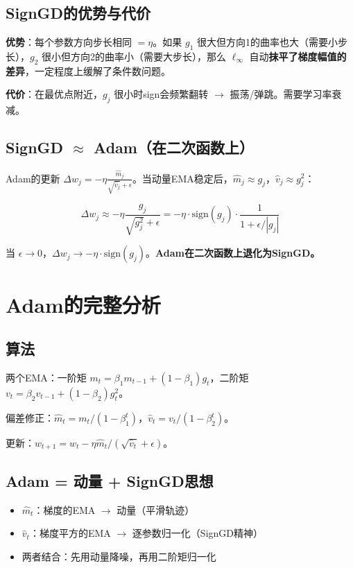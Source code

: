 \documentclass[12pt,a4paper]{article}
\begin{document}
\subsection{SignGD的优势与代价}

\textbf{优势}：每个参数方向步长相同 $= \eta$。如果 $g_1$ 很大但方向1的曲率也大（需要小步长），$g_2$ 很小但方向2的曲率小（需要大步长），那么 $\ell_\infty$ 自动\textbf{抹平了梯度幅值的差异}，一定程度上缓解了条件数问题。

\textbf{代价}：在最优点附近，$g_j$ 很小时sign会频繁翻转 $\to$ 振荡/弹跳。需要学习率衰减。


\subsection{SignGD $\approx$ Adam（在二次函数上）}

Adam的更新 $\Delta w_j = -\eta \frac{\hat{m}_j}{\sqrt{\hat{v}_j}+\epsilon}$。当动量EMA稳定后，$\hat{m}_j \approx g_j$，$\hat{v}_j \approx g_j^2$：


\[\Delta w_j \approx -\eta \frac{g_j}{\sqrt{g_j^2}+\epsilon} = -\eta \cdot \text{sign}(g_j) \cdot \frac{1}{1+\epsilon/|g_j|}\]

当 $\epsilon \to 0$，$\Delta w_j \to -\eta \cdot \text{sign}(g_j)$。\textbf{Adam在二次函数上退化为SignGD。}




\section{Adam的完整分析}


\subsection{算法}

两个EMA：一阶矩 $m_t = \beta_1 m_{t-1} + (1-\beta_1)g_t$，二阶矩 $v_t = \beta_2 v_{t-1} + (1-\beta_2)g_t^2$。

偏差修正：$\hat{m}_t = m_t/(1-\beta_1^t)$，$\hat{v}_t = v_t/(1-\beta_2^t)$。

更新：$w_{t+1} = w_t - \eta \hat{m}_t / (\sqrt{\hat{v}_t}+\epsilon)$。


\subsection{Adam = 动量 + SignGD思想}

\begin{itemize}[leftmargin=*,nosep]
\item $\hat{m}_t$：梯度的EMA $\to$ 动量（平滑轨迹）
\item $\hat{v}_t$：梯度平方的EMA $\to$ 逐参数归一化（SignGD精神）
\item 两者结合：先用动量降噪，再用二阶矩归一化
\end{itemize}
\end{document}
